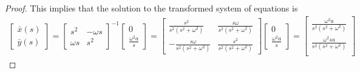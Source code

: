 \begin{proof}
  This implies that the solution to the transformed system of equations is
  \begin{align*}
    \begin{bmatrix}
      \bar{x}(s) \\
      \bar{y}(s)
    \end{bmatrix}
    =
    \begin{bmatrix}
      s^2 & -\omega s \\
      \omega s & s^2
    \end{bmatrix}
    ^{-1}
    \begin{bmatrix}
      0 \\
      \frac{\omega^2 a}{s}
    \end{bmatrix}
    =
    \begin{bmatrix}
      \frac{s^2}{s^2(s^2 + \omega^2)} & \frac{s\omega}{s^2(s^2 + \omega^2)} \\
      -\frac{s\omega}{s^2(s^2 + \omega^2)} & \frac{s^2}{s^2(s^2 + \omega^2)}
    \end{bmatrix}
    \begin{bmatrix}
      0 \\
      \frac{\omega^2 a}{s}
    \end{bmatrix}
    =
    \begin{bmatrix}
      \frac{\omega^3 a}{s^2(s^2 + \omega^2)} \\
      \frac{\omega^2 s a}{s^2(s^2 + \omega^2)} \\
    \end{bmatrix}
  \end{align*}


\end{proof}
